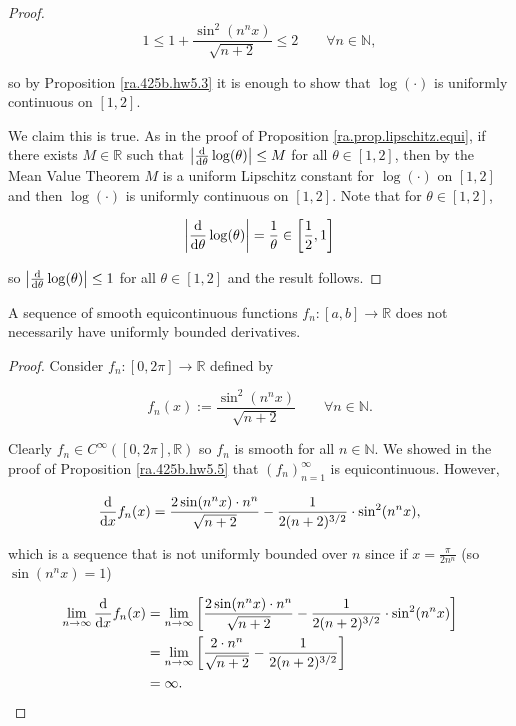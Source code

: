 \begin{proof}
\[
1 \leq 1 +  \frac{\sin^2(n^n x)}{\sqrt{n+2}} \leq 2 \qquad \forall n \in \mathbb{N},
\]

so by Proposition \ref{ra.425b.hw5.3} it is enough to show that \(\log(\cdot)\) is uniformly continuous on \([1,2]\). 

We claim this is true. As in the proof of Proposition  \ref{ra.prop.lipschitz.equi}, if there exists \(M \in \mathbb{R}\) such that \( \left| \deriv{}{\theta} \log(\theta)  \right| \leq M \) for all \(\theta \in [1,2]\), then by the Mean Value Theorem \(M\) is a uniform Lipschitz constant for \(\log(\cdot)\) on \([1,2]\) and then \(\log(\cdot)\) is uniformly continuous on \([1,2]\). Note that for \(\theta \in [1,2]\),

\[
 \left| \deriv{}{\theta} \log(\theta)  \right| = \frac{1}{\theta} \in \left[ \frac{1}{2}, 1 \right]
\]

so \( \left| \deriv{}{\theta} \log(\theta)  \right| \leq 1 \) for all \(\theta \in [1,2]\) and the result follows.


\end{proof}

\begin{proposition}

A sequence of smooth equicontinuous functions \(f_n: [a,b] \to \mathbb{R}\) does not necessarily have uniformly bounded derivatives.

\end{proposition}

\begin{proof}

Consider \(f_n: [0, 2\pi] \to \mathbb{R}\) defined by 

\[
f_n(x) := \frac{\sin^2(n^n x)}{\sqrt{n+2}} \qquad \forall n \in \mathbb{N}.
\]

Clearly \(f_n \in C^\infty([0,2\pi], \mathbb{R})\) so \(f_n\) is smooth for all \(n \in \mathbb{N}\). We showed in the proof of Proposition \ref{ra.425b.hw5.5} that \((f_n)_{n=1}^\infty\) is equicontinuous. However,

\[
\deriv{}{x} f_n(x) = \frac{2 \sin(n^nx) \cdot n^n }{\sqrt{n+2}} - \frac{1}{2 (n+2)^{3/2}} \cdot \sin^2(n^n x),
\]

which is a sequence that is not uniformly bounded over \(n\) since if \(x = \frac{\pi}{2n^n}\) (so \( \sin(n^nx) = 1\))

\begin{align*}
\lim_{n \to \infty} \deriv{}{x} f_n(x)  & = \lim_{n \to \infty} \left[ \frac{2 \sin(n^n x ) \cdot n^n }{\sqrt{n+2}}  - \frac{1}{2 (n+2)^{3/2}} \cdot \sin^2(n^n x) \right]
\\ & = \lim_{n \to \infty} \left[ \frac{2  \cdot n^n }{\sqrt{n+2}}  - \frac{1}{2 (n+2)^{3/2}}  \right]
\\ & = \infty.
\end{align*}

\end{proof}











